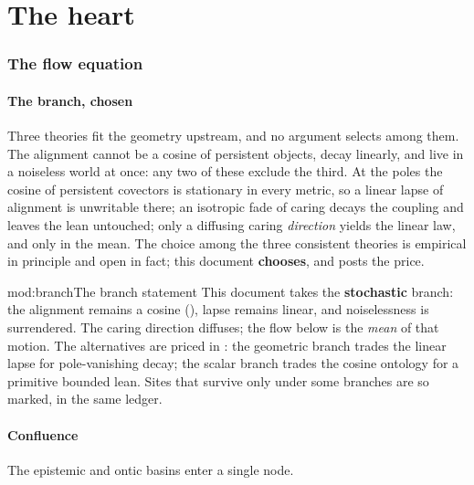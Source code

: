 \documentclass[../main]{subfiles}
\begin{document}
\clearpage
\part{The heart}

\section{The flow equation}
\label{sec:flow}

\subsection{The branch, chosen}
\label{subsec:flow:branch}
%
Three theories fit the geometry upstream, and no argument selects among them. The
alignment cannot be a cosine of persistent objects, decay linearly, and live in a
noiseless world at once: any two of these exclude the third. At the poles the cosine of
persistent covectors is stationary in every metric, so a linear lapse of alignment is
unwritable there; an isotropic fade of caring decays the coupling and leaves the lean
untouched; only a diffusing caring \emph{direction} yields the linear law, and only in
the mean. The choice among the three consistent theories is empirical in principle and
open in fact; this document \textbf{chooses}, and posts the price.

\begin{statement}{mod:branch}{The branch statement}
  This document takes the \textbf{stochastic} branch: the alignment remains a cosine
  (), lapse remains linear, and noiselessness is surrendered. The caring
  direction diffuses; the flow below is the \emph{mean} of that motion. The alternatives
  are priced in : the geometric branch trades the linear lapse for
  pole-vanishing decay; the scalar branch trades the cosine ontology for a primitive
  bounded lean. Sites that survive only under some branches are so marked, in the same
  ledger.
\end{statement}

\subsection{Confluence}
\label{subsec:flow:confluence}
%
The epistemic and ontic basins enter a single node.
\end{document}

